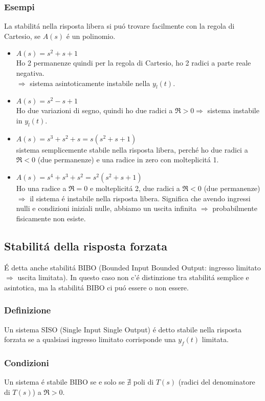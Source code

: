 \documentclass[../main.tex]{subfiles}
\begin{document}
	\subsubsection{Esempi}
	La stabilit\'{a} nella risposta libera si pu\'{o} trovare facilmente con la regola di Cartesio, se $ A(s) $ \'{e} un polinomio.
	\begin{itemize}
		\item $ A(s) = s^2+s+1 $\\
		Ho 2 permanenze quindi per la regola di Cartesio, ho 2 radici a parte reale negativa.\\
		$ \Rightarrow $ sistema asintoticamente instabile nella $ y_l(t) $.
		\item $ A(s) = s^2 - s + 1 $\\
		Ho due variazioni di segno, quindi ho due radici a $ \Re > 0 \Rightarrow $ sistema instabile in $ y_l(t) $.
		\item $ A(s) = s^3+s^2+s = s(s^2+s+1)$\\
		sistema semplicemente stabile nella risposta libera, perch\'{e} ho due radici a $ \Re < 0 $ (due permanenze) e una radice in zero con molteplicit\'{a} 1.
		\item $ A(s) = s^4+s^3+s^2 = s^2(s^2+s+1) $\\
		Ho una radice a $ \Re = 0 $ e molteplicit\'{a} 2, due radici a $ \Re < 0 $ (due permanenze) $ \Rightarrow $ il sistema \'{e} instabile nella risposta libera.
		Significa che avendo ingressi nulli e condizioni iniziali nulle, abbiamo un uscita infinita $ \Rightarrow $ probabilmente fisicamente non esiste. 
	\end{itemize}
	\subsection{Stabilit\'{a} della risposta forzata}
	\'{E} detta anche stabilit\'{a} BIBO (Bounded Input Bounded Output: ingresso limitato $ \Rightarrow $ uscita limitata).
	In questo caso non c'\'{e} distinzione tra stabilit\'{a} semplice e asintotica, ma la stabilit\'{a} BIBO ci pu\'{o} essere o non essere.
	\subsubsection{Definizione}
	Un sistema SISO (Single Input Single Output) \'{e} detto stabile nella risposta forzata se a qualsiasi ingresso limitato corrisponde una $ y_f(t) $ limitata.
	\subsubsection{Condizioni}
	Un sistema \'{e} stabile BIBO se e solo se $ \nexists $ poli di $ T(s) $ (radici del denominatore di $ T(s) $) a $ \Re > 0 $.
\end{document}
